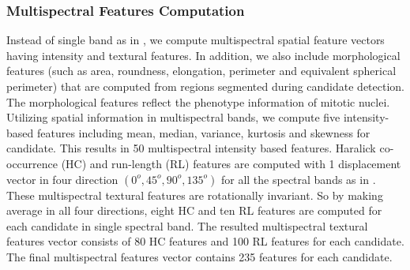 \documentclass[10pt,twocolumn,letterpaper]{article}
\begin{document}
\subsubsection{Multispectral Features Computation}
Instead of single band as in \cite{boucheron2007, masood2009, wu2009, wu2012}, we compute multispectral spatial feature vectors having intensity and textural features. In addition, we also include morphological features (such as area, roundness, elongation, perimeter and equivalent spherical perimeter) that are computed from regions segmented during candidate detection. The morphological features reflect the phenotype information of mitotic nuclei. Utilizing spatial information in multispectral bands, we compute five intensity-based features including mean, median, variance, kurtosis and skewness for candidate. This results in 50 multispectral intensity based features. Haralick co-occurrence (HC) \cite{haralick1973} and run-length (RL) \cite{galloway1975} features are computed with 1 displacement vector in four direction $(0^o, 45^o, 90^o, 135^o)$ for all the spectral bands as in \cite{irshad2013b}. These multispectral textural features are rotationally invariant. So by making average in all four directions, eight HC and ten RL features are computed for each candidate in single spectral band. The resulted multispectral textural features vector consists of 80 HC features and 100 RL features for each candidate. The final multispectral features vector contains 235 features for each candidate. 
\end{document}

